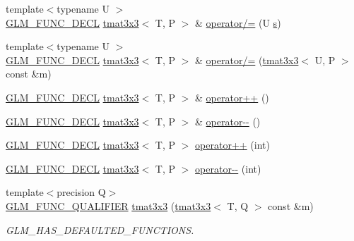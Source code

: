 \begin{DoxyCompactItemize}
\item 
{\footnotesize template$<$typename U $>$ }\\\mbox{\hyperlink{setup_8hpp_ab2d052de21a70539923e9bcbf6e83a51}{G\+L\+M\+\_\+\+F\+U\+N\+C\+\_\+\+D\+E\+CL}} \mbox{\hyperlink{structglm_1_1tmat3x3}{tmat3x3}}$<$ T, P $>$ \& \mbox{\hyperlink{structglm_1_1tmat3x3_ad05055d1d22efff71a9f4b98f6f649fd}{operator/=}} (U \mbox{\hyperlink{glad_8h_af1b1d5edfea6a34daee7389b1b5810ad}{s}})
\item 
{\footnotesize template$<$typename U $>$ }\\\mbox{\hyperlink{setup_8hpp_ab2d052de21a70539923e9bcbf6e83a51}{G\+L\+M\+\_\+\+F\+U\+N\+C\+\_\+\+D\+E\+CL}} \mbox{\hyperlink{structglm_1_1tmat3x3}{tmat3x3}}$<$ T, P $>$ \& \mbox{\hyperlink{structglm_1_1tmat3x3_a890dc9c4a08a6439357222ae650a0222}{operator/=}} (\mbox{\hyperlink{structglm_1_1tmat3x3}{tmat3x3}}$<$ U, P $>$ const \&m)
\item 
\mbox{\hyperlink{setup_8hpp_ab2d052de21a70539923e9bcbf6e83a51}{G\+L\+M\+\_\+\+F\+U\+N\+C\+\_\+\+D\+E\+CL}} \mbox{\hyperlink{structglm_1_1tmat3x3}{tmat3x3}}$<$ T, P $>$ \& \mbox{\hyperlink{structglm_1_1tmat3x3_abf574c05769a6e30060fceee846cc823}{operator++}} ()
\item 
\mbox{\hyperlink{setup_8hpp_ab2d052de21a70539923e9bcbf6e83a51}{G\+L\+M\+\_\+\+F\+U\+N\+C\+\_\+\+D\+E\+CL}} \mbox{\hyperlink{structglm_1_1tmat3x3}{tmat3x3}}$<$ T, P $>$ \& \mbox{\hyperlink{structglm_1_1tmat3x3_ae5483abbd6a2e5d7698aa6cbd0e1f8c8}{operator-\/-\/}} ()
\item 
\mbox{\hyperlink{setup_8hpp_ab2d052de21a70539923e9bcbf6e83a51}{G\+L\+M\+\_\+\+F\+U\+N\+C\+\_\+\+D\+E\+CL}} \mbox{\hyperlink{structglm_1_1tmat3x3}{tmat3x3}}$<$ T, P $>$ \mbox{\hyperlink{structglm_1_1tmat3x3_a4065f5ff3fe1b587e329700e69d5d453}{operator++}} (int)
\item 
\mbox{\hyperlink{setup_8hpp_ab2d052de21a70539923e9bcbf6e83a51}{G\+L\+M\+\_\+\+F\+U\+N\+C\+\_\+\+D\+E\+CL}} \mbox{\hyperlink{structglm_1_1tmat3x3}{tmat3x3}}$<$ T, P $>$ \mbox{\hyperlink{structglm_1_1tmat3x3_a976b9d2832d53ea5049e9e86f6bf8323}{operator-\/-\/}} (int)
\item 
{\footnotesize template$<$precision Q$>$ }\\\mbox{\hyperlink{setup_8hpp_a33fdea6f91c5f834105f7415e2a64407}{G\+L\+M\+\_\+\+F\+U\+N\+C\+\_\+\+Q\+U\+A\+L\+I\+F\+I\+ER}} \mbox{\hyperlink{structglm_1_1tmat3x3_a7d0662c2d46d1709c245e21181f3adff}{tmat3x3}} (\mbox{\hyperlink{structglm_1_1tmat3x3}{tmat3x3}}$<$ T, Q $>$ const \&m)
\begin{DoxyCompactList}\small\item\em G\+L\+M\+\_\+\+H\+A\+S\+\_\+\+D\+E\+F\+A\+U\+L\+T\+E\+D\+\_\+\+F\+U\+N\+C\+T\+I\+O\+NS. \end{DoxyCompactList}\item 

\end{DoxyCompactItemize}
